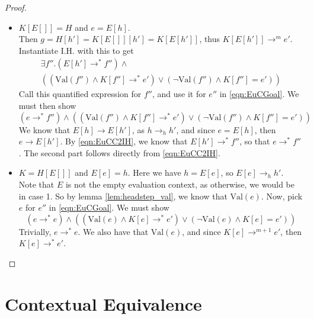 \documentclass[twoside,11pt,openright]{report}
\theoremstyle{definition}
\newcommand{\expr}{e}
\newcommand{\elctx}{K}
\newcommand{\step}{\rightarrow}
\newcommand{\stepS}{\rightarrow^*}
\newcommand{\hstep}{\rightarrow_h}
\newcommand{\Val}[1]{\mathrm{Val}(#1)}
\begin{document}
\begin{proof}
\begin{itemize}
\begin{itemize}
      \item $\elctx[E[]] = H$ and $\expr = E[h]$.\\
        Then $g = H[h'] = \elctx[E[]][h'] = \elctx[E[h']]$, thus $\elctx[E[h']] \step^m \expr'$. Instantiate I.H. with this to get
        \begin{multline}\label{eqn:EuCC2IH}
          \exists f'' . (E[h'] \stepS f'') \land\\
          \left((\Val{f''} \land \elctx[f''] \stepS \expr') \lor
          (\neg \Val{f''} \land \elctx[f''] = \expr') \right)
        \end{multline}
        Call this quantified expression for $f''$, and use it for $\expr''$ in \ref{eqn:EuCGoal}. We must then show
        \begin{equation*}
          (\expr \stepS f'') \land 
          \left( (\Val{f''} \land \elctx[f''] \stepS \expr') \lor
          (\neg \Val{f''} \land \elctx[f''] = \expr') \right)
        \end{equation*}
        We know that $E[h] \step E[h']$, as $h \hstep h'$, and since $\expr = E[h]$, then $\expr \step E[h']$. By 
        \ref{eqn:EuCC2IH}, we know that $E[h'] \stepS f''$, so that $\expr \stepS f''$. The second part follows directly from \ref{eqn:EuCC2IH}.

      \item $\elctx = H[E[]]$ and $E[\expr] = h$.
        Here we have $h = E[\expr]$, so $E[\expr] \hstep h'$. Note that $E$ is not the empty evaluation context, as otherwise, we would be in case 1. So by lemma \ref{lem:headstep_val}, we know that $\Val{\expr}$. Now, pick $\expr$ for $\expr''$ in \ref{eqn:EuCGoal}. We must show 
        \begin{equation*}
          (\expr \stepS \expr) \land 
          \left( (\Val{\expr} \land \elctx[\expr] \stepS \expr') \lor
          (\neg \Val{\expr} \land \elctx[\expr] = \expr') \right)
        \end{equation*}
        Trivially, $\expr \stepS \expr$. We also have that $\Val{\expr}$, and since $\elctx[\expr] \step^{m + 1} \expr'$, then $\elctx[\expr] \stepS \expr'$.
    \end{itemize}
  \end{itemize}

\end{proof}



\chapter{Contextual Equivalence}
\label{ch:CE}
\end{document}
